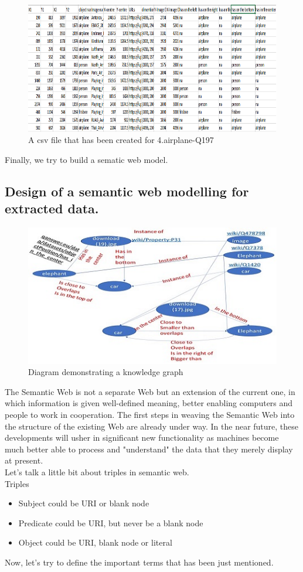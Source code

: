 \documentclass[12pt]{article}
\begin{document}
\begin{figure}[!h]
\includegraphics{images/ioCSVp.png}
\caption{A csv file that has been created for 4.airplane-Q197}
\end{figure}


Finally, we try to build a sematic web model.
\newpage
\subsection{Design of a semantic web modelling for extracted data.}
\begin{figure}[!h]
\center

\includegraphics{images/semanticWeb.jpg}
\caption{Diagram demonstrating a knowledge graph}
\end{figure}

The Semantic Web is not a separate Web but an
extension of the current one, in which information is
given well-defined meaning, better enabling computers
and people to work in cooperation. The first steps in
weaving the Semantic Web into the structure of the
existing Web are already under way. In the near future,
these developments will usher in significant new
functionality as machines become much better able to
process and "understand" the data that they merely
display at present\cite{berners2001semantic}. \\Let's talk a little bit about triples in semantic web.\\Triples
\begin{itemize}
\item Subject could be URI or blank node
\item Predicate could be URI, but never be a blank node
\item Object could be URI, blank node or literal
\end{itemize}
\newpage
Now, let's try to define the important terms that has been just mentioned.
\end{document}
